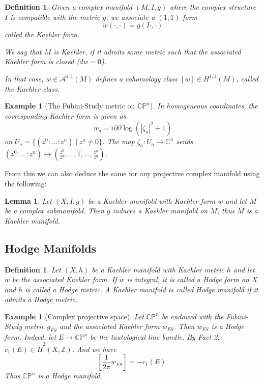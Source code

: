 \documentclass[12pt]{article}
\theoremstyle{darkgreentheorem}
\newtheorem{lm}[thm]{Lemma}
\theoremstyle{darkbluedefinition}
\newtheorem{defn}[thm]{Definition}
\theoremstyle{darkredexample}
\newtheorem{exa}[thm]{Example}
\theoremstyle{remark}
\newcommand{\Z}{\mathbb{Z}}
\newcommand{\1}{\mathbbm{1}}
\newcommand{\C}{\mathbb{C}}
\newcommand{\CP}{\mathbb{CP}}
\newcommand{\A}{\mathscr{A}}
\begin{document}
\begin{defn}
    Given a complex manifold $(M,I,g)$ where the complex structure $I$ is compatible with the metric $g$, we associate a $(1,1)$-form
    \[ w(\cdot,\cdot)=g(I\cdot,\cdot) \]
    called the \textit{Kaehler form}.

    We say that $M$ is Kaehler, if it admits some metric such that the associated Kaehler form is closed ($dw=0$).

    In that case, $w\in \A^{1,1}(M)$ defines a cohomology class $[w]\in H^{1,1}(M)$, called the \textit{Kaehler class}.
\end{defn}

\begin{exa}[The Fubini-Study metric on $\CP^{n}$]
    In homogeneous coordinates, the corresponding Kaehler form is given as
    \[ w_{a}=i\partial \bar{\partial}\log(|\zeta_{a}|^{2}+1) \]
    on $U_{a}=\{(z^{0}:\ldots:z^{n})\mid z^{a}\neq 0\}$.
    The map $\zeta_{a}\colon U_{a}\to \C^{n}$ sends $(z^{0}:\ldots:z^{n})\mapsto (\frac{z^{0}}{z^{a}},\ldots,\hat{1},\ldots,\frac{z^{n}}{z^{a}})$.
\end{exa}

From this we can also deduce the same for any projective complex manifold using the following:

\begin{lm}
    Let $(X,I,g)$ be a Kaehler manifold with Kaehler form $w$ and let $M$ be a complex submanifold.
    Then $g$ induces a Kaehler manifold on $M$, thus $M$ is a Kaehler manifold.
\end{lm}

\subsection{Hodge Manifolds}

\begin{defn}
    Let $(X,h)$ be a Kaehler manifold with Kaehler metric $h$ and let $w$ be the associated Kaehler form.
    If $w$ is integral, it is called a \textit{Hodge form} on $X$ and $h$ is called a \textit{Hodge metric}.
    A Kaehler manifold is called \textit{Hodge manifold} if it admits a Hodge metric.
\end{defn}

\begin{exa}[Complex projective space]
    Let $\CP^{n}$ be endowed with the Fubini-Study metric $g_{FS}$ and the associated Kaehler form $w_{FS}$.
    Then $w_{FS}$ is a Hodge form.
    Indeed, let $E\to \CP^{n}$ be the tautological line bundle.
    By Fact 2, $c_{1}(E)\in \tilde{H}^{2}(X,\Z)$.
    And we have
    \[ \left[\frac{1}{2\pi} w_{FS}\right] =-c_{1}(E).\]
    Thus $\CP^{n}$ is a Hodge manifold.
\end{exa}
\end{document}
